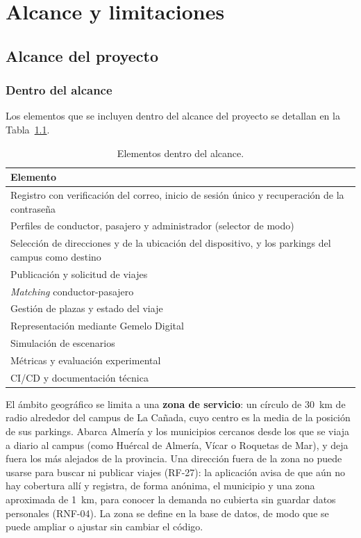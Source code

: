 
\chapter{Alcance y limitaciones}
\label{ch:alcance}

\section{Alcance del proyecto}

\subsection{Dentro del alcance}

Los elementos que se incluyen dentro del alcance del proyecto se detallan en la Tabla~\ref{tab:dentro-alcance}.

\begin{table}[H]
  \centering
  \begin{tabular}{@{}p{\textwidth}@{}}
    \hline
    \textbf{Elemento} \\
    \hline
    Registro con verificación del correo, inicio de sesión único y recuperación de la contraseña \\
    Perfiles de conductor, pasajero y administrador (selector de modo) \\
    Selección de direcciones y de la ubicación del dispositivo, y los parkings del campus como destino \\
    Publicación y solicitud de viajes \\
    \textit{Matching} conductor-pasajero \\
    Gestión de plazas y estado del viaje \\
    Representación mediante Gemelo Digital \\
    Simulación de escenarios \\
    Métricas y evaluación experimental \\
    CI/CD y documentación técnica \\
    \hline
  \end{tabular}
  \caption{Elementos dentro del alcance.}
  \label{tab:dentro-alcance}
\end{table}

El ámbito geográfico se limita a una \textbf{zona de servicio}: un círculo de 30~km de radio alrededor del campus de La Cañada, cuyo centro es la media de la posición de sus parkings. Abarca Almería y los municipios cercanos desde los que se viaja a diario al campus (como Huércal de Almería, Vícar o Roquetas de Mar), y deja fuera los más alejados de la provincia. Una dirección fuera de la zona no puede usarse para buscar ni publicar viajes (RF-27): la aplicación avisa de que aún no hay cobertura allí y registra, de forma anónima, el municipio y una zona aproximada de 1~km, para conocer la demanda no cubierta sin guardar datos personales (RNF-04). La zona se define en la base de datos, de modo que se puede ampliar o ajustar sin cambiar el código.

